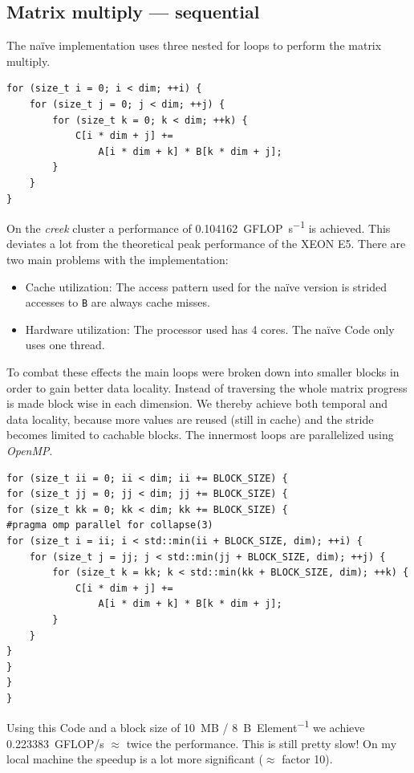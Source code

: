 \documentclass[]{scrartcl}
\begin{document}
\subsection{Matrix multiply --- sequential}
The naïve implementation uses three nested for loops to perform the matrix multiply.
\lstset{language=C++}
\begin{lstlisting}[H]
for (size_t i = 0; i < dim; ++i) {
	for (size_t j = 0; j < dim; ++j) {
		for (size_t k = 0; k < dim; ++k) {
			C[i * dim + j] +=
			    A[i * dim + k] * B[k * dim + j];
		}
	}
}
\end{lstlisting}
On the \emph{creek} cluster a performance of \SI{0.104162}{GFLOP\per\second} is achieved.
This deviates a lot from the theoretical peak performance of the XEON E5.
There are two main problems with the implementation:
\begin{itemize}
	\item Cache utilization: The access pattern used for the naïve version
		is strided accesses to \texttt{B} are always cache misses.
	\item Hardware utilization: The processor used has 4 cores. The
		naïve Code only uses one thread.
\end{itemize}
To combat these effects the main loops were broken down into smaller blocks in order
to gain better data locality. Instead of traversing the whole matrix progress is made
block wise in each dimension. We thereby achieve both temporal and data locality, because
more values are reused (still in cache) and the stride becomes limited to cachable blocks.
The innermost loops are parallelized using \emph{OpenMP}.
\begin{lstlisting}[H]
for (size_t ii = 0; ii < dim; ii += BLOCK_SIZE) {
for (size_t jj = 0; jj < dim; jj += BLOCK_SIZE) {
for (size_t kk = 0; kk < dim; kk += BLOCK_SIZE) {
#pragma omp parallel for collapse(3)
for (size_t i = ii; i < std::min(ii + BLOCK_SIZE, dim); ++i) {
	for (size_t j = jj; j < std::min(jj + BLOCK_SIZE, dim); ++j) {
		for (size_t k = kk; k < std::min(kk + BLOCK_SIZE, dim); ++k) {
			C[i * dim + j] +=
			    A[i * dim + k] * B[k * dim + j];
		}
	}
}
}
}
}
\end{lstlisting}
Using this Code and a block size of \SI{10}{\mega B} / \SI{8}{B\per Element}
we achieve \SI{0.223383}{GFLOP/s} $\approx$ twice the performance.
This is still pretty slow! On my local machine the speedup is a lot more significant ($\approx$ factor 10).
\end{document}
